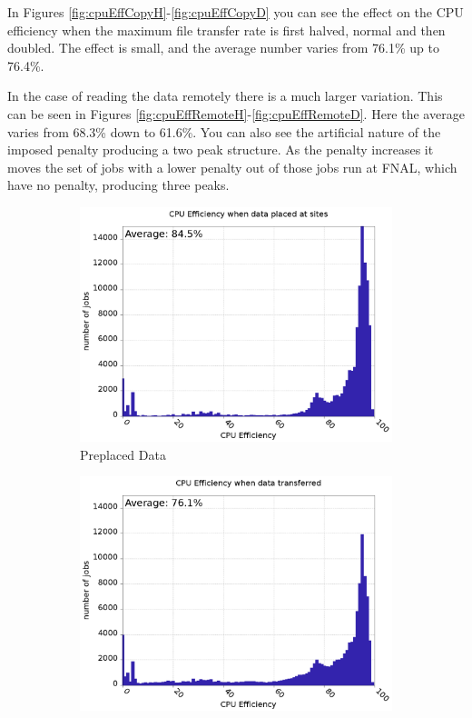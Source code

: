\documentclass[a4paper]{jpconf}
\begin{document}
In Figures \ref{fig:cpuEffCopyH}-\ref{fig:cpuEffCopyD} you can see the
effect on the CPU efficiency when the maximum file transfer rate is
first halved, normal and then doubled. The effect is small, and the
average number varies from 76.1\% up to 76.4\%.

In the case of reading the data remotely there is a much larger
variation. This can be seen in Figures
\ref{fig:cpuEffRemoteH}-\ref{fig:cpuEffRemoteD}. Here the average
varies from 68.3\% down to 61.6\%. You can also see the artificial
nature of the imposed penalty producing a two peak structure. As the
penalty increases it moves the set of jobs with a lower penalty out of
those jobs run at FNAL, which have no penalty, producing three peaks.

\begin{figure}
  \begin{center}
    \hspace{2.7cm}
    \begin{subfigure}{0.3\textwidth}
      \includegraphics[width=\textwidth]{figures/T_FP0_RP0CPUEff.png}
      \caption{Preplaced Data\label{fig:cpuEffToday}}
    \end{subfigure}
    \newline
    \begin{subfigure}{0.3\textwidth}
      \includegraphics[width=\textwidth]{figures/S_FM1_RP0CPUEff.png}

\end{subfigure}
\end{center}
\end{figure}
\end{document}
